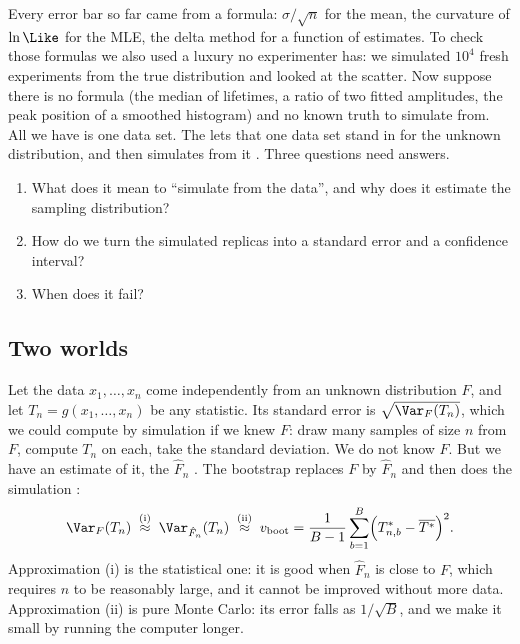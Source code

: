 Every error bar so far came from a formula: $\sigma/\sqrt n$ for the mean,
the curvature of $\ln\Like$ for the MLE, the delta method for a function of
estimates. To check those formulas we also used a luxury no experimenter
has: we simulated $10^4$ fresh experiments from the true distribution and
looked at the scatter. Now suppose there is no formula (the median of
lifetimes, a ratio of two fitted amplitudes, the peak position of a
smoothed histogram) and no known truth to simulate from. All we have is one
data set. The  lets that one data set stand in for the
unknown distribution, and then simulates from it \cite{Efron1979}. Three
questions need answers.
\begin{enumerate}[label=\arabic*.]
  \item What does it mean to ``simulate from the data'', and why does it
        estimate the sampling distribution?
  \item How do we turn the simulated replicas into a standard error and a
        confidence interval?
  \item When does it fail?
\end{enumerate}

\subsection{Two worlds}
\label{3b:sec:boot-idea}

Let the data $x_1,\dots,x_n$ come independently from an unknown
distribution $F$, and let $T_n=g(x_1,\dots,x_n)$ be any statistic. Its
standard error is $\sqrt{\Var_F(T_n)}$, which we could compute by
simulation if we knew $F$: draw many samples of size $n$ from $F$, compute
$T_n$ on each, take the standard deviation. We do not know $F$. But we have
an estimate of it, the  $\hat F_n$
. The bootstrap replaces $F$ by $\hat F_n$ and
then does the simulation :
\[
  \Var_F(T_n)\;\overset{\text{(i)}}{\approx}\;\Var_{\hat F_n}(T_n)
  \;\overset{\text{(ii)}}{\approx}\;v_{\text{boot}}
  =\frac1{B-1}\sum_{b=1}^B\Bigl(T^*_{n,b}-\overline{T^*}\Bigr)^2 .
\]
Approximation (i) is the statistical one: it is good when $\hat F_n$ is
close to $F$, which requires $n$ to be reasonably large, and it cannot be
improved without more data. Approximation (ii) is pure Monte Carlo: its
error falls as $1/\sqrt B$, and we make it small by running the computer
longer.

